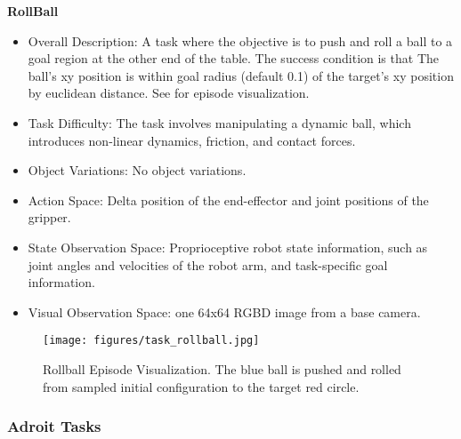 \textbf{RollBall}
\begin{itemize}
    \item Overall Description: A task where the objective is to push and roll a ball to a goal region at the other end of the table. The success condition is that The ball’s xy position is within goal radius (default 0.1) of the target’s xy position by euclidean distance. See  for episode visualization.
    \item Task Difficulty: The task involves manipulating a dynamic ball, which introduces non-linear dynamics, friction, and contact forces.
    \item Object Variations: No object variations.
    \item Action Space: Delta position of the end-effector and joint positions of the gripper.
    \item State Observation Space: Proprioceptive robot state information, such as joint angles and velocities of the robot arm, and task-specific goal information.
    \item Visual Observation Space: one 64x64 RGBD image from a base camera.
\end{itemize}
\begin{figure}[!ht]
    \centering
    \texttt{[image: figures/task\_rollball.jpg]}
    \caption{Rollball Episode Visualization. The blue ball is pushed and rolled from sampled initial configuration to the target red circle.}
    \label{fig:task_rollball}
\end{figure}

\subsubsection{Adroit Tasks}

